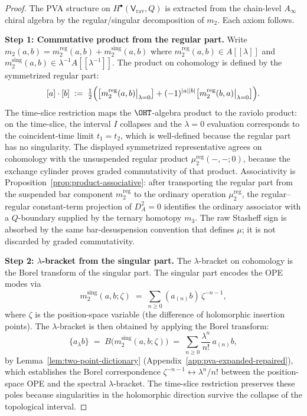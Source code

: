 \begin{proof}
The PVA structure on $H^\bullet(\mathsf{V}_{\mathrm{rav}}, Q)$ is extracted from the chain-level $A_\infty$ chiral algebra by the regular/singular decomposition of $m_2$. Each axiom follows.

\medskip\noindent\textbf{Step 1: Commutative product from the regular part.}
Write $m_2(a,b) = m_2^{\mathrm{reg}}(a,b) + m_2^{\mathrm{sing}}(a,b)$ where $m_2^{\mathrm{reg}}(a,b)\in A[[\lambda]]$ and $m_2^{\mathrm{sing}}(a,b)\in \lambda^{-1}A[[\lambda^{-1}]]$. The product on cohomology is defined by the symmetrized regular part:
\[
 [a]\cdot [b] \;:=\; \tfrac{1}{2}\Bigl(\bigl[m_2^{\mathrm{reg}}(a,b)\big|_{\lambda=0}\bigr] + (-1)^{|a||b|}\bigl[m_2^{\mathrm{reg}}(b,a)\big|_{\lambda=0}\bigr]\Bigr).
\]
The time-slice restriction maps the $\OHT$-algebra product to the
raviolo product: on the time-slice, the interval $I$ collapses and the
$\lambda=0$ evaluation corresponds to the coincident-time limit
$t_1=t_2$, which is well-defined because the regular part has no
singularity. The displayed symmetrized representative agrees on
cohomology with the unsuspended regular product
\(\mu_2^{\mathrm{reg}}(-,-;0)\), because the exchange cylinder proves
graded commutativity of that product. Associativity is
Proposition~\ref{prop:product-associative}: after transporting the
regular part from the suspended bar component \(m_2^{\mathrm{reg}}\)
to the ordinary operation \(\mu_2^{\mathrm{reg}}\), the
regular--regular constant-term projection of \(D_A^2=0\) identifies
the ordinary associator with a \(Q\)-boundary supplied by the ternary
homotopy \(m_3\). The raw Stasheff sign is absorbed by the same
bar-desuspension convention that defines \(\mu\); it is not discarded
by graded commutativity.

\medskip\noindent\textbf{Step 2: $\lambda$-bracket from the singular part.}
The $\lambda$-bracket on cohomology is the Borel transform of the
singular part. The singular part encodes the OPE modes via
\[
 m_2^{\mathrm{sing}}(a,b;\zeta) \;=\; \sum_{n \ge 0} (a_{(n)}b)\,\zeta^{-n-1},
\]
where $\zeta$ is the position-space variable (the difference of holomorphic insertion points). The $\lambda$-bracket is then obtained by applying the Borel transform:
\[
 \{a{}_\lambda b\} \;=\; B\bigl(m_2^{\mathrm{sing}}(a,b;\zeta)\bigr) \;=\; \sum_{n \ge 0} \frac{\lambda^n}{n!}\, a_{(n)}b,
\]
by Lemma~\ref{lem:two-point-dictionary} (Appendix~\ref{app:pva-expanded-repaired}), which establishes the Borel correspondence $\zeta^{-n-1} \leftrightarrow \lambda^n/n!$ between the position-space OPE and the spectral $\lambda$-bracket. The time-slice restriction preserves these poles because singularities in the holomorphic direction survive the collapse of the topological interval.


\end{proof}
